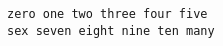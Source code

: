 \documentclass{article}
\begin{document}
\begin{lstlisting}
zero one two three four five
sex seven eight nine ten many
\end{lstlisting}
\end{document}
